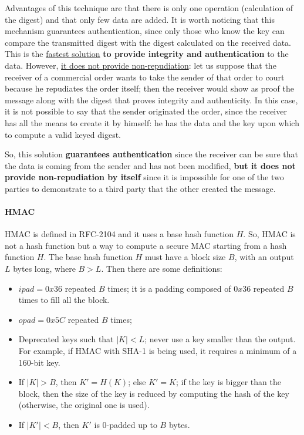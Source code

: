 Advantages of this technique are that there is only one operation (calculation of the digest) and that only few data are added. It is worth noticing that this mechanism guarantees authentication, since only those who know the key can compare the transmitted digest with the digest calculated on the received data. This is the \underline{fastest solution} \textbf{to provide integrity and authentication} to the data. However, \underline{it does not provide non-repudiation}: let us suppose that the receiver of a commercial order wants to take the sender of that order to court because he repudiates the order itself; then the receiver would show as proof the message along with the digest that proves integrity and authenticity. In this case, it is not possible to say that the sender originated the order, since the receiver has all the means to create it by himself: he has the data and the key upon which to compute a valid keyed digest.

So, this solution \textbf{guarantees authentication} since the receiver can be sure that the data is coming from the sender and has not been modified, \textbf{but it does not provide non-repudiation by itself} since it is impossible for one of the two parties to demonstrate to a third party that the other created the message.


\paragraph{HMAC}
HMAC is defined in RFC-2104 and it uses a base hash function \(H\). So, HMAC is not a hash function but a way to compute a secure MAC starting from a hash function \(H\). The base hash function \(H\) must have a block size \(B\), with an output \(L\) bytes long, where \(B > L\). Then there are some definitions:
\begin{itemize}
    \item \(ipad = 0x36\) repeated \(B\) times; it is a padding composed of \(0x36\) repeated \(B\) times to fill all the block.
    \item \(opad = 0x5C\) repeated \(B\) times;
    \item Deprecated keys such that \(|K| < L\); never use a key smaller than the output. For example, if HMAC with SHA-1 is being used, it requires a minimum of a 160-bit key.
    \item If \(|K| > B\), then \(K' = H(K)\); else \(K' = K\); if the key is bigger than the block, then the size of the key is reduced by computing the hash of the key (otherwise, the original one is used).
    \item If \(|K'| < B\), then \(K'\) is 0-padded up to \(B\) bytes.
\end{itemize}

